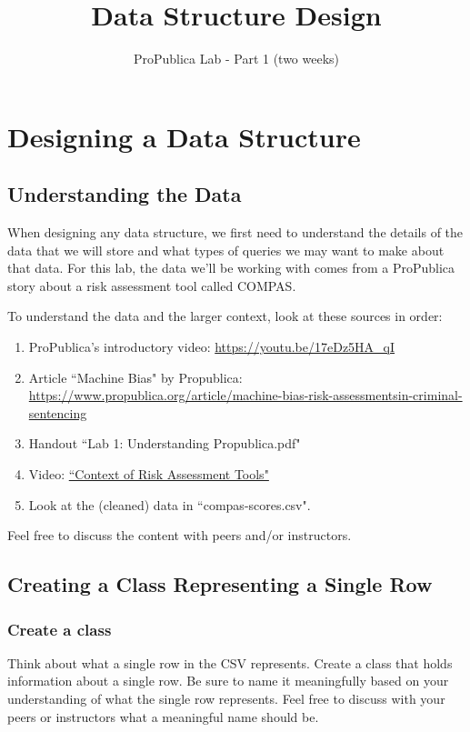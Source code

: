 \documentclass[12pt]{article}
\title{Data Structure Design}
\date{ProPublica Lab - Part 1 (two weeks)} %
\begin{document}
\maketitle

\section{Designing a Data Structure}

\subsection{Understanding the Data}
When designing any data structure, we first need to understand the details of the data that we will store and what types of queries we may want to make about that data.  For this lab, the data we'll be working with comes from a ProPublica story about a risk assessment tool called COMPAS.

To understand the data and the larger context, look at these sources in order:
\begin{enumerate}
\item ProPublica's introductory video: \href{https://youtu.be/17eDz5HA_qI}{https://youtu.be/17eDz5HA\_qI}
\item Article ``Machine Bias" by Propublica: \href{https://www.propublica.org/article/machine-bias-risk-assessments-in-criminal-sentencing}{https://www.propublica.org/article/\newline machine-bias-risk-assessmentsin-criminal-sentencing}
\item Handout ``Lab 1: Understanding Propublica.pdf"
\item Video: \href{http://sorelle.friedler.net/riskassessmentsintro.mp4}{``Context of Risk Assessment Tools"}
\item Look at the (cleaned) data in ``compas-scores.csv". 
\end{enumerate}
%
Feel free to discuss the content with peers and/or instructors. %

\subsection{Creating a Class Representing a Single Row}
\subsubsection{Create a class}
Think about what a single row in the CSV represents.  Create a class that holds information about a single row.  Be sure to name it meaningfully based on your understanding of what the single row represents.  Feel free to discuss with your peers or instructors what a meaningful name should be.
\end{document}
